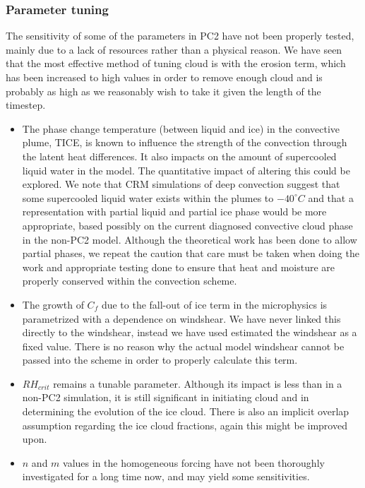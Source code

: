 \documentclass{UMDP_article}
\begin{document}
\subsubsection{Parameter tuning}
The sensitivity of some of the parameters in PC2 have not been properly
tested, mainly due to a lack of resources rather than a physical reason.
We have seen that the most effective method of tuning cloud is with the
erosion term, which has been increased to high values in order to remove
enough cloud and is probably as high as we reasonably wish to take it given
the length of the timestep.
\begin{itemize}
\item{The phase change temperature (between liquid and ice) in the
convective plume, TICE, is known to influence the strength of the convection
through the latent heat differences. It also impacts on the amount of
supercooled liquid water in the model. The quantitative impact of altering
this could be explored. We note that CRM simulations of deep convection
suggest that some supercooled liquid water exists within the plumes to
$-40 ^{\circ} C$ and that a representation with partial liquid and partial
ice phase would be more appropriate, based possibly on the current diagnosed
convective cloud phase in the non-PC2 model. Although the theoretical work
has been done to allow partial phases, we repeat the caution that care
must be taken when doing the work and appropriate testing done to ensure
that heat and moisture are properly conserved within the convection scheme.}

\item{The growth of $C_f$ due to the fall-out of ice term in the microphysics
is parametrized with a dependence on windshear. We have never linked this
directly to the windshear, instead we have used estimated the windshear
as a fixed value. There is no reason why the actual model windshear cannot
be passed into the scheme in order to properly calculate this term.} 
\item{$RH_{crit}$ remains a tunable parameter. Although its impact is less
than in a non-PC2 simulation, it is still significant in initiating cloud
and in determining the evolution of the ice cloud. There is also an implicit
overlap assumption regarding the ice cloud fractions, again this might be
improved upon.}
\item{$n$ and $m$ values in the homogeneous forcing have not been
thoroughly investigated for a long time now, and may yield some sensitivities}.
\end{itemize}
\end{document}
